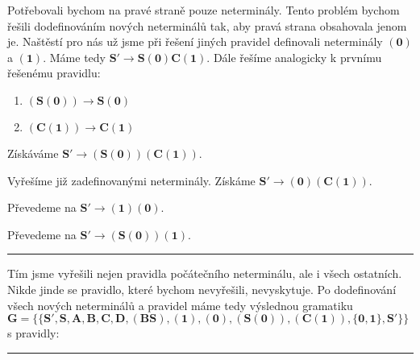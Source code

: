 \documentclass{report}
\begin{document}
\begin{description}
    Potřebovali bychom na pravé straně pouze neterminály. Tento problém bychom řešili dodefinováním nových neterminálů tak, aby pravá strana obsahovala jenom je. Naštěstí pro nás už jsme při řešení jiných pravidel definovali neterminály $\mathbf{(0)}$ a $\mathbf{(1)}$. Máme tedy $\mathbf{S' \rightarrow S(0)C(1)}$. Dále řešíme analogicky k prvnímu řešenému pravidlu:
    \begin{enumerate}
        \item[]$\mathbf{(S(0)) \rightarrow S(0)}$
        \item[]$\mathbf{(C(1)) \rightarrow C(1)}$
    \end{enumerate}
    Získáváme  $\mathbf{S' \rightarrow (S(0))(C(1))}$.
    \item[\fbox{$\mathbf{S' \rightarrow 0C1}$}] Vyřešíme již zadefinovanými neterminály. Získáme $\mathbf{S' \rightarrow (0)(C(1))}$.
    \item[\fbox{$\mathbf{S' \rightarrow 10}$}] Převedeme na $\mathbf{S' \rightarrow (1)(0)}$.
    \item[\fbox{$\mathbf{S' \rightarrow S01}$}] Převedeme na $\mathbf{S' \rightarrow (S(0))(1)}$.
\end{description}
\pagebreak
\vspace{0.1cm}
\hrule
\vspace{0.4cm}
Tím jsme vyřešili nejen pravidla počátečního neterminálu, ale i všech ostatních. Nikde jinde se pravidlo, které bychom nevyřešili, nevyskytuje. Po dodefinování všech nových neterminálů a pravidel máme tedy výslednou gramatiku $\mathbf{G = \{\{S',S,A,B,C,D,(BS),(1),(0),(S(0)),(C(1)),\{0,1\},S'\}\}}$ s pravidly:
\vspace{0.4cm}    
\hrule
\vspace{0.1cm}
\end{document}
